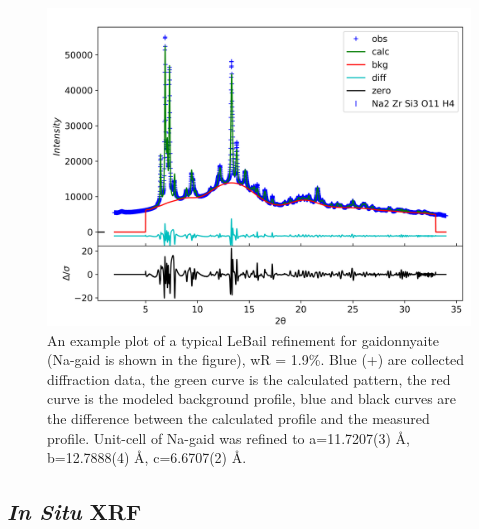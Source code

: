 \documentclass[journal=acsodf,manuscript=article]{achemso}
\begin{document}
\begin{figure}[h!]   %
\begin{center}
\includegraphics[width=0.70\columnwidth]{figures/lebail_ex_CsH_001.png}
\caption{{An example plot of a typical LeBail refinement for gaidonnyaite (Na-gaid
is shown in the figure), wR = 1.9\%.  Blue (+) are collected diffraction
data, the green curve is the calculated pattern, the red curve is the
modeled background profile, blue and black curves are the difference
between the calculated profile and the measured profile.  Unit-cell of
Na-gaid was refined to a=11.7207(3) \AA, b=12.7888(4) \AA, c=6.6707(2) \AA.
{\label{fig_xrd_lebail}}%
}}
\end{center}
\end{figure} 


\subsection{\emph{In Situ} XRF}
{\label{sec_XRF}}  %
\end{document}
